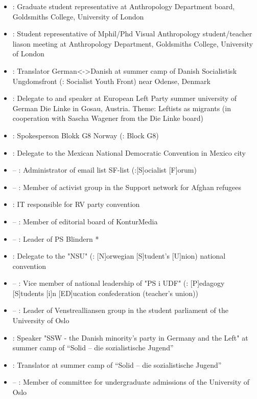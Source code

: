 \begin{itemize}
\item {}: Graduate student representative at Anthropology Department board, Goldsmiths College, University of London
\item {}: Student representative of Mphil/Phd Visual Anthropology student/teacher liason meeting at Anthropology Department, Goldsmiths College, University of London
\item {}: Translator German<->Danish at summer camp of Danish Socialistisk Ungdomsfront (\english: Socialist Youth Front) near Odense, Denmark
\item {}: Delegate to and speaker at European Left Party summer university of German Die Linke in Gosau, Austria. Theme: Leftists as migrants (in cooperation with Sascha Wagener from the Die Linke board)
\item {}: Spokesperson Blokk G8 Norway (\english: Block G8)
\item {}: Delegate to the Mexican National Democratic Convention in Mexico city
\item {} – : Administrator of email list SF-list (\english:[S]ocialist [F]orum)
\item {} – : Member of activist group in the Support network for Afghan refugees
\item {}: IT responsible for RV party convention
\item {} – : Member of editorial board of KonturMedia
\item {} – : Leader of PS Blindern *
\item {}: Delegate to the "NSU" (\english: [N]orwegian [S]tudent's [U]nion) national convention
\item {} – : Vice member of national leadership of "PS i UDF" (\english: [P]edagogy [S]tudents [i]n [ED]ucation confederation (teacher's union))
\item {} – : Leader of Venstrealliansen group in the student parliament of the University of Oslo
\item {}: Speaker "SSW - the Danish minority's party in Germany and the Left" at summer camp of “Solid – die sozialistische Jugend”
\item {}: Translator at summer camp of “Solid – die sozialistische Jugend”
\item {} – : Member of committee for undergraduate admissions of the University of Oslo

\end{itemize}
